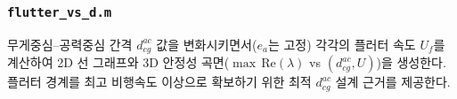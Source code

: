 \documentclass[
	a4paper, %
	10pt, %
]{CSUniSchoolLabReport}
\begin{document}


\subsubsection{\texttt{flutter\_vs\_d.m}}
무게중심--공력중심 간격 \(d_{cg}^{ac}\) 값을 변화시키면서(\(e_a\)는 고정) 각각의 플러터 속도 \(U_f\)를 계산하여
2D 선 그래프와 3D 안정성 곡면(\(\max\,\mathrm{Re}(\lambda)\) vs \((d_{cg}^{ac}, U)\))을 생성한다.
플러터 경계를 최고 비행속도 이상으로 확보하기 위한 최적 \(d_{cg}^{ac}\) 설계 근거를 제공한다.



\printbibliography %
\end{document}
